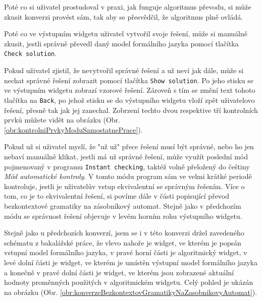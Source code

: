 Poté co si uživatel prostudoval v praxi, jak funguje algoritmus převodu, si může zkusit konverzi provést sám, tak aby se přesvědčil, že algoritmus plně ovládá. 

Poté co ve výstupním widgetu uživatel vytvořil svoje řešení, může si manuálně zkusit, jestli správně převedl daný model formálního jazyka pomocí tlačítka \texttt{Check solution}. 

Pokud uživatel zjistil, že nevytvořil správné řešení a už neví jak dále, může si nechat správné řešení zobrazit pomocí tlačítka \texttt{Show solution}. Po jeho stisku se ve výstupním widgetu zobrazí vzorové řešení. Zároveň s tím se změní text tohoto tlačítka na \texttt{Back}, po jehož stisku se do výstupního widgetu vloží zpět uživatelovo řešení, přesně tak jak jej zanechal. Zobrzení techto dvou respektive tří kontrolních prvků můžete vidět na obrázku (Obr. \ref{obr:kontrolniPrvkyModuSamostatnePrace}).



Pokud už si uživatel myslí, že "už už" přece řešení musí být správné, nebo ho jen nebaví manuálně klikat, jestli má už správné řešení, může využít poslední mód pojmenovaný v programu \texttt{Instant checking}, taktéž volně přeložený do češtiny \textit{Mód automatické kontroly}. V tomto módu program sám ve velmi krátké periodě kontroluje, jestli je uživatelův vstup ekvivalentní se správným řešením. Více o tom, co je to ekvivalentní řešení, si povíme dále v části popisující převod bezkontextové gramatiky na zásobníkový automat. Stejně jako v předchozím módu se správnost řešení objevuje v levém horním rohu výstupního widgetu. 


Stejně jako u předchozích konverzí, jsem se i v této konverzi držel zavedeného schématu z bakalářské práce, že vlevo nahoře je widget, ve kterém je popsán vstupní model formálního jazyka, v pravé horní části je algoritmický widget, v levé dolní části je widget, ve kterém je umístěn výstupní model formálního jazyka a konečně v pravé dolní části je widget, ve kterém jsou zobrazené aktuální hodnoty proměnných použitých v algoritmickém widgetu. Celý pohled je ukázán na obrázku (Obr. \ref{obr:konverzeBezkontextovGramatikyNaZasobnikovyAutomat}). 

